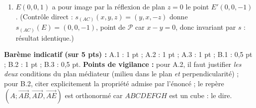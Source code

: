 \documentclass[11pt]{article}
\begin{document}
\begin{corrige}
\begin{enumerate}
\item $E(0,0,1)$ a pour image par la réflexion de plan $z=0$ le point $E'(0,0,-1)$. (Contrôle direct : $s_{(AC)}(x,y,z)=(y,x,-z)$ donne $s_{(AC)}(E)=(0,0,-1)$, point de $\mathcal{P}$ car $x-y=0$, donc invariant par $s$ : résultat identique.)
\end{enumerate}
\textbf{Barème indicatif (sur 5 pts) :} A.1 : 1 pt ; A.2 : 1 pt ; A.3 : 1 pt ; B.1 : 0,5 pt ; B.2 : 1 pt ; B.3 : 0,5 pt.
\textbf{Points de vigilance :} pour A.2, il faut justifier \emph{les deux} conditions du plan médiateur (milieu dans le plan \emph{et} perpendicularité) ; pour B.2, citer explicitement la propriété admise par l'énoncé ; le repère $(A;\overrightarrow{AB},\overrightarrow{AD},\overrightarrow{AE})$ est orthonormé car $ABCDEFGH$ est un cube : le dire.
\end{corrige}
\end{document}
